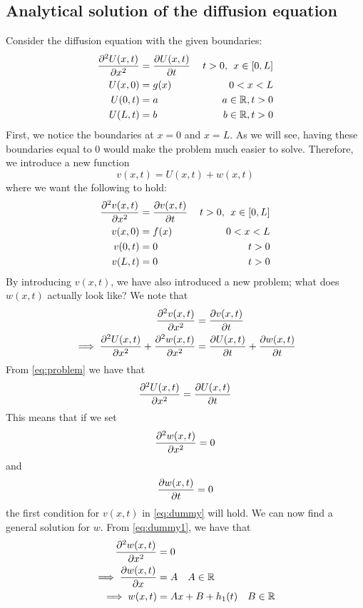 \documentclass[12pt,english,a4paper]{article}
\begin{document}
\subsection{Analytical solution of the diffusion equation}
Consider the diffusion equation with the given boundaries:
\begin{equation}\label{eq:problem}
\begin{aligned}
\pdv[2]{U(x,t)}{x} &= \pdv{U(x,t)}{t} &\: t>0, \:\:x\in[0,L] \\
U(x,0) &= g(x)  &0 < x < L\\
U(0,t) &=  a & a \in \mathbb{R},  t>0 \\
U(L,t) &= b &b \in \mathbb{R}, t>0
\end{aligned}
\end{equation}
First, we notice the boundaries at \(x = 0\) and \(x = L\). As we will see, having these boundaries equal to 0 would make the problem much easier to solve. Therefore, we introduce a new function
\[
v(x,t) = U(x,t) + w(x,t)
\]
where we want the following to hold:
\begin{equation}\label{eq:dummy}
\begin{aligned}
\pdv[2]{v(x,t)}{x} &= \pdv{v(x,t)}{t} &\: t>0, \:\:x\in[0,L] \\
v(x,0) &= f(x)  &0 < x < L\\
v(0,t) &=  0 &  t>0 \\
v(L,t) &= 0 & t>0
\end{aligned}
\end{equation}
By introducing \(v(x,t)\), we have also introduced a new problem; what does \(w(x,t)\) actually look like? We note that
\begin{alignat*}{2}
\pdv[2]{v(x,t)}{x} &= \pdv{v(x,t)}{t}  \\
\implies \pdv[2]{U(x,t)}{x} + \pdv[2]{w(x,t)}{x} &= \pdv{U(x,t)}{t} + \pdv{w(x,t)}{t}
\end{alignat*}
From \ref{eq:problem} we have that
\[
\pdv[2]{U(x,t)}{x} = \pdv{U(x,t)}{t}
\]
This means that if we set
\begin{equation} \label{eq:dummy1}
 \pdv[2]{w(x,t)}{x}  = 0
\end{equation}
and
\begin{equation} \label{eq:dummy2}
 \pdv{w(x,t)}{t} = 0
\end{equation}
the first condition for \(v(x,t)\) in \vref{eq:dummy} will hold. We can now find a general solution for \(w\). From \vref{eq:dummy1}, we have that
\begin{align}
	\pdv[2]{w(x,t)}{x}  &= 0 \nonumber \\
	\implies\pdv{w(x,t)}{x} &= A  \quad A \in \mathbb{R} \nonumber \\
	\implies w(x,t) &= Ax + B + h_1(t) \quad B \in \mathbb{R} \label{eq:wX}
\end{align}
\end{document}
